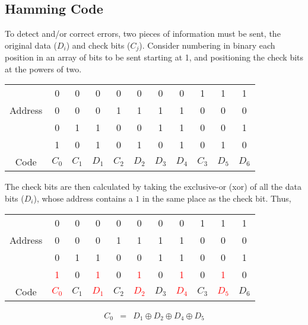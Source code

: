 \subsection{Hamming Code}

To detect and/or correct errors, two pieces of information must be sent, the original data ($D_i$) and check bits ($C_j$). Consider numbering in binary each position in an array of bits to be sent starting at 1, and positioning the check bits at the powers of two.

\begin{tabular}{|c|c|c|c|c|c|c|c|c|c|c|}
\hline
& 0 & 0 & 0 & 0 & 0 & 0 & 0 & 1 & 1 & 1 \\
Address & 0 & 0 & 0 & 1 & 1 & 1 & 1 & 0 & 0 & 0 \\
& 0 & 1 & 1 & 0 & 0 & 1 & 1 & 0 & 0 & 1 \\
& 1 & 0 & 1 & 0 & 1 & 0 & 1 & 0 & 1 & 0 \\ \hline
Code& $C_0$ & $C_1$ & $D_1$ & $C_2$ & $D_2$ & $D_3$ & $D_4$ & $C_3$ & $D_5$ & $D_6$ \\ \hline
\end{tabular}

The check bits are then calculated by taking the exclusive-or (xor) of all the data bits ($D_i$), whose address contains a $1$ in the same place as the check bit.  Thus,

\vspace{.1in}
\begin{tabular}{|c|c|c|c|c|c|c|c|c|c|c|}
\hline
& 0 & 0 & 0 & 0 & 0 & 0 & 0 & 1 & 1 & 1 \\
Address & 0 & 0 & 0 & 1 & 1 & 1 & 1 & 0 & 0 & 0 \\
& 0 & 1 & 1 & 0 & 0 & 1 & 1 & 0 & 0 & 1 \\
& \textcolor{red}{1} & 0 & \textcolor{red}{1} & 0 & \textcolor{red}{1} & 0 & \textcolor{red}{1} & 0 & \textcolor{red}{1} & 0 \\ \hline
Code& \textcolor{red}{$C_0$} & $C_1$ & \textcolor{red}{$D_1$} & $C_2$ & \textcolor{red}{$D_2$} & $D_3$ & \textcolor{red}{$D_4$} & $C_3$ & \textcolor{red}{$D_5$} & $D_6$ \\ \hline
\end{tabular}
\begin{eqnarray*}
  C_0 &=& D_1 \oplus D_2 \oplus D_4 \oplus D_5
\end{eqnarray*}

